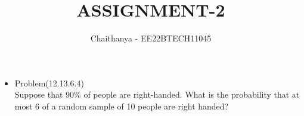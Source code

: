 \documentclass{article}
\title{ASSIGNMENT-2}
\author{Chaithanya - EE22BTECH11045 }
\begin{document}
\maketitle
\begin{itemize}
\item Problem(12.13.6.4)\\
Suppose that 90\% of people are right-handed. What is the probability that at most 6 of a random sample of 10 people are right handed?
\end{itemize}
\end{document}
